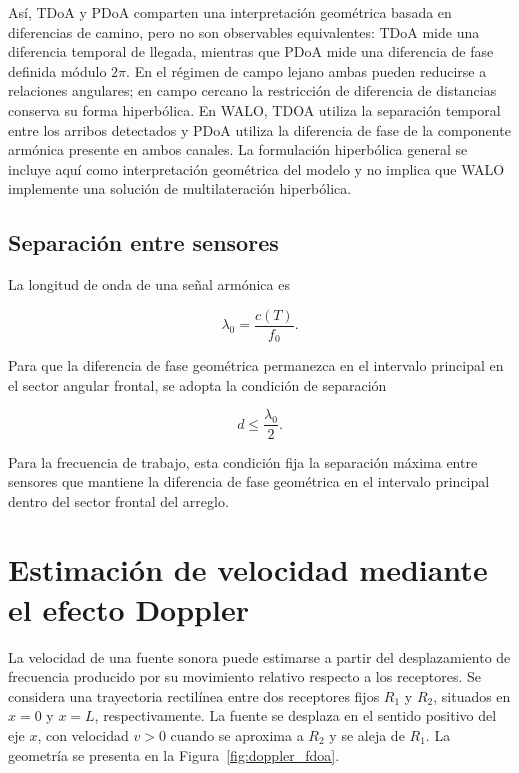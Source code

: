 Así, TDoA y PDoA comparten una interpretación geométrica basada en
diferencias de camino, pero no son observables equivalentes: TDoA mide
una diferencia temporal de llegada, mientras que PDoA mide una
diferencia de fase definida módulo $2\pi$. En el régimen de campo
lejano ambas pueden reducirse a relaciones angulares; en campo cercano
la restricción de diferencia de distancias conserva su forma
hiperbólica. En WALO, TDOA utiliza la separación temporal entre los
arribos detectados y PDoA utiliza la diferencia de fase de la componente
armónica presente en ambos canales. La formulación hiperbólica general
se incluye aquí como interpretación geométrica del modelo y no implica
que WALO implemente una solución de multilateración hiperbólica.

\subsection{Separación entre sensores}

La longitud de onda de una señal armónica es

\begin{equation}
    \lambda_0 = \frac{c(T)}{f_0}.
    \label{eq:longitud_onda}
\end{equation}

Para que la diferencia de fase geométrica permanezca en el intervalo
principal en el sector angular frontal, se adopta la condición de
separación

\begin{equation}
    d \leq \frac{\lambda_0}{2}.
    \label{eq:condicion_aliasing}
\end{equation}

Para la frecuencia de trabajo, esta condición fija la separación
máxima entre sensores que mantiene la diferencia de fase geométrica
en el intervalo principal dentro del sector frontal del arreglo.

\section{Estimación de velocidad mediante el efecto Doppler}

La velocidad de una fuente sonora puede estimarse a partir del
desplazamiento de frecuencia producido por su movimiento relativo
respecto a los receptores. Se considera una trayectoria rectilínea
entre dos receptores fijos $R_1$ y $R_2$, situados en $x=0$ y $x=L$,
respectivamente. La fuente se desplaza en el sentido positivo del
eje $x$, con velocidad $v>0$ cuando se aproxima a $R_2$ y se aleja
de $R_1$. La geometría se presenta en la
Figura~\ref{fig:doppler_fdoa}.

